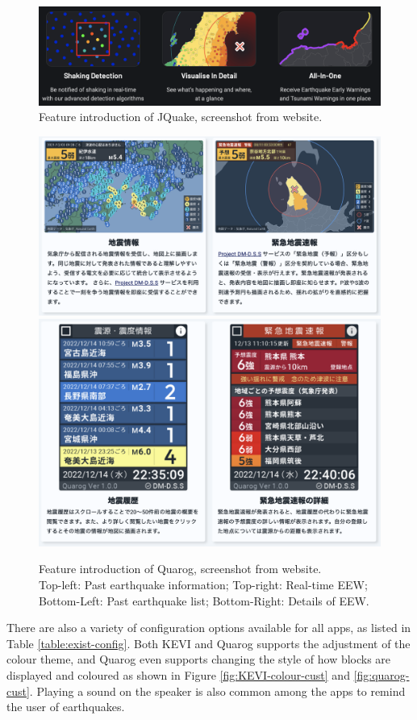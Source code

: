 \documentclass[10pt]{article}
\begin{document}
\begin{figure}[!ht]
    \centering

    \includegraphics[width=0.6\linewidth]{jquake-features.png}
    \caption[Feature introduction of JQuake]{Feature introduction of JQuake, screenshot from website.}
    \label{fig:jquake-monitor-features}
\end{figure}

\begin{figure}[!ht]
    \centering

    \includegraphics[width=0.6\linewidth]{quarog-features-1.png}\\
    \includegraphics[width=0.6\linewidth]{quarog-features-2.png}
    \caption[Feature introduction of Quarog]{Feature introduction of Quarog, screenshot from website.\\Top-left: Past earthquake information; Top-right: Real-time EEW;\\Bottom-Left: Past earthquake list; Bottom-Right: Details of EEW.}
    \label{fig:quarog-monitor-features}
\end{figure}

There are also a variety of configuration options available for all apps, as listed in Table \ref{table:exist-config}. Both KEVI and Quarog supports the adjustment of the colour theme, and Quarog even supports changing the style of how blocks are displayed and coloured as shown in Figure \ref{fig:KEVI-colour-cust} and \ref{fig:quarog-cust}. Playing a sound on the speaker is also common among the apps to remind the user of earthquakes.
\end{document}

